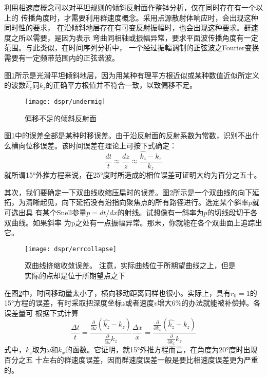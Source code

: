 利用相速度概念可以对平坦规则的倾斜反射面作整钵分析，仅在同时存在有一个以上的
传播角度时，才需要利用群速度概念。采用点源散射体响应时，会出现这种同时性的要求，
在沿倾斜地层存在有可变反射振幅时，也会出现这种要求。群速度之所以需要，是因为表示
弯曲同相轴或振幅异常，要求平面波传播角度有一定范围。与此类似，在时间序列分析中，
一个经过振輻调制的正弦波之Fourier变换需要有一定频带范围内的正弦谐波。

图\ref{fig:dspr/undermig}所示是光滑平坦倾斜地层，因为用某种有理平方根近似或某种数值近似所定义
的波数$\hat{k_z}$同$k_z$的正确平方根值并不符合一致，以致偏移不足。

\begin{figure}[H]
\centering
\texttt{[image: dspr/undermig]}
\caption[undermig]{偏移不足的倾斜反射面}
\label{fig:dspr/undermig}
\end{figure}

图\ref{fig:dspr/undermig}中的误差全部是某种时移误差。由于沿反射面的反射系数为常数，识别不出什
么横向位移误差。该时间误差在理论上可按下式确定：
\begin{equation}
\frac{dt}{t}\approx\frac{dz}{z}\approx\frac{\hat{k_z}-k_z}{k_z}
\label{eq.ex4.2.2}
\end{equation}
就所谓15°外推方程来说，在25°度时所造成的相位误差可证明大约为百分之五十。

其次，我们要确定一下双曲线收缩压扁时的误差。图\ref{fig:dspr/errcollapse}所示是一个双曲线的向下延
拓，为清晰起见，向下延拓没有沿指向聚焦点的所有路径进行。选定某个斜率$p$就可选出具
有某个Snell参量$p=dt/dx$的射线。试想像有一斜率为$p$的切线段切于各双曲线。如果斜率
为p之处有一点振幅异常。那末，你就能在各个双曲面上追踪出它。

\begin{figure}[H]
\centering
\texttt{[image: dspr/errcollapse]}
\caption[errcollapse]{双曲线挤缩收敛误差。
注意，实际曲线位于所期望曲线之上，但是
实际的点却是位于所期望点之下}
\label{fig:dspr/errcollapse}
\end{figure}

在图\ref{fig:dspr/errcollapse}中，时间移动量太小了，横向移动距离同样也很小。实际上，具有$r_0=1$的
15°方程的误差，有时采取把深度坐标$z$或者速度$v$增大6\%的办法就能被补偿掉。各误差量可
根据下式计算
\begin{subequations}
\begin{equation}
\frac{\Delta t}{t}=\frac{\frac{\partial}{\partial \omega}(\hat{k_z}-k_z)}{\frac{\partial}{\partial \omega}k_z}
\label{eq:ex4.2.3a}
\end{equation}
\begin{equation}
\frac{\Delta x}{x}=\frac{\frac{\partial}{\partial k_x}(\hat{k_z}-k_z)}{\frac{\partial}{\partial k_x}k_z}
\label{eq:ex4.2.3b}
\end{equation}
\label{eq:ex4.2.3}
\end{subequations}
式中，$k_z$取为$\omega$和$k_x$的函数。它证明，就15°外推方程而言，在角度为20°度时出现百分之五
十左右的群速度误差，因而群速度误差一般是要比相速度误差更为严重的。

